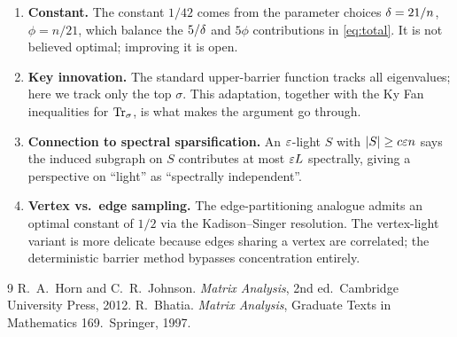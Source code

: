 \begin{enumerate}\setlength\itemsep{4pt}
\item \textbf{Constant.} The constant $1/42$ comes from the parameter choices
$\delta=21/n$, $\phi=n/21$, which balance the $5/\delta$ and $5\phi$ contributions
in \eqref{eq:total}. It is not believed optimal; improving it is open.
\item \textbf{Key innovation.} The standard upper-barrier function tracks all
eigenvalues; here we track only the top $\sigma$. This adaptation, together
with the Ky Fan inequalities for $\operatorname{Tr}_{\sigma}$, is what makes the argument go
through.
\item \textbf{Connection to spectral sparsification.} An $\varepsilon$-light $S$ with
$|S|\ge c\varepsilon n$ says the induced subgraph on $S$ contributes at most $\varepsilon L$
spectrally, giving a perspective on ``light'' as ``spectrally independent''.
\item \textbf{Vertex vs.\ edge sampling.} The edge-partitioning analogue
admits an optimal constant of $1/2$ via the Kadison--Singer resolution. The
vertex-light variant is more delicate because edges sharing a vertex are
correlated; the deterministic barrier method bypasses concentration entirely.
\end{enumerate}

\begin{thebibliography}{9}
 R.~A.~Horn and C.~R.~Johnson.
  \emph{Matrix Analysis}, 2nd ed.\ Cambridge University Press, 2012.
 R.~Bhatia.
  \emph{Matrix Analysis}, Graduate Texts in Mathematics 169.\ Springer, 1997.
\end{thebibliography}

\endgroup